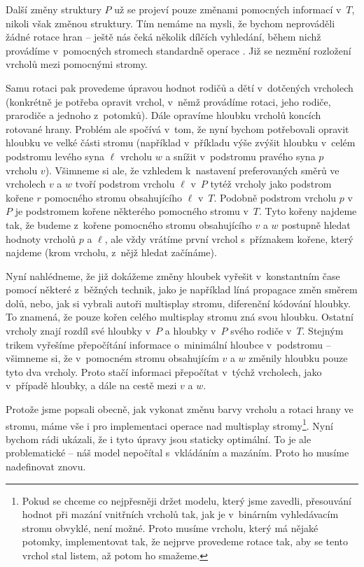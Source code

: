 Další změny struktury $P$ už se projeví pouze změnami pomocných informací
v~$T$, nikoli však změnou struktury. Tím nemáme na mysli, že bychom neprováděli
žádné rotace hran -- ještě nás čeká několik dílčích vyhledání, během nichž
provádíme v~pomocných stromech standardně operace . Již se nezmění
rozložení vrcholů mezi pomocnými stromy.

Samu rotaci pak provedeme úpravou hodnot rodičů a dětí v~dotčených vrcholech
(konkrétně je potřeba opravit vrchol, v~němž provádíme rotaci, jeho rodiče,
prarodiče a jednoho z~potomků). Dále opravíme hloubku vrcholů koncích rotované hrany. Problém ale spočívá v~tom, že nyní bychom
potřebovali opravit hloubku ve velké části stromu (například v~příkladu výše
zvýšit hloubku v~celém podstromu levého syna $\ell$ vrcholu $w$ a snížit
v~podstromu pravého syna $p$ vrcholu $v$). Všimneme si ale, že vzhledem
k~nastavení preferovaných směrů ve vrcholech $v$ a $w$ tvoří podstrom vrcholu
$\ell$ v~$P$ tytéž vrcholy jako podstrom kořene $r$ pomocného stromu
obsahujícího $\ell$ v~$T$. Podobně podstrom vrcholu $p$ v~$P$ je podstromem
kořene některého pomocného stromu v~$T$. Tyto kořeny najdeme tak, že budeme
z~kořene pomocného stromu obsahujícího $v$ a $w$ postupně hledat hodnoty
vrcholů $p$ a $\ell$, ale vždy vrátíme první vrchol s~příznakem kořene, který
najdeme (krom vrcholu, z~nějž hledat začínáme).

Nyní nahlédneme, že již dokážeme změny hloubek vyřešit v~konstantním čase pomocí některé
z~běžných technik, jako je například líná propagace změn směrem dolů, nebo, jak si
vybrali autoři multisplay stromu, diferenční kódování hloubky. To znamená, že
pouze kořen celého multisplay stromu zná svou hloubku. Ostatní vrcholy znají
rozdíl své hloubky v~$P$ a hloubky v~$P$ svého rodiče v~$T$. Stejným trikem
vyřešíme přepočítání informace o~minimální hloubce v~podstromu -- všimneme si, že
v~pomocném stromu obsahujícím $v$ a $w$ změnily hloubku pouze tyto dva vrcholy.
Proto stačí informaci přepočítat v~týchž vrcholech, jako v~případě hloubky, a
dále na cestě mezi $v$ a $w$.

Protože jsme popsali obecně, jak vykonat změnu barvy vrcholu a rotaci hrany ve
stromu, máme vše i pro implementaci operace  nad multisplay
stromy\footnote{Pokud se chceme co nejpřesněji držet modelu, který jsme
zavedli, přesouvání hodnot při mazání vnitřních vrcholů tak, jak je v~binárním
vyhledávacím stromu obvyklé, není možné. Proto musíme  vrcholu,
který má nějaké potomky, implementovat tak, že nejprve provedeme rotace tak,
aby se tento vrchol stal listem, až potom ho smažeme.}. Nyní bychom rádi ukázali,
že i tyto úpravy jsou staticky optimální. To je ale problematické -- náš model
nepočítal s~vkládáním a mazáním. Proto ho musíme nadefinovat znovu.

